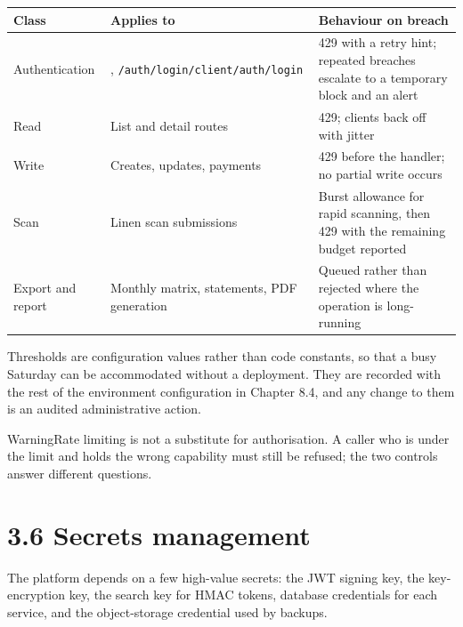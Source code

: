 \documentclass[11pt,a4paper,oneside]{book}
\begin{document}
\begin{center}\small
\begin{tabularx}{\linewidth}{|X|X|X|}
\hline
\rowcolor{lightgrey}
\textbf{Class} & \textbf{Applies to} & \textbf{Behaviour on breach} \\ \hline
Authentication & , \texttt{/auth/login}\texttt{/client/auth/login} & 429 with a retry hint; repeated breaches escalate to a temporary block and an alert \\ \hline
Read & List and detail routes & 429; clients back off with jitter \\ \hline
Write & Creates, updates, payments & 429 before the handler; no partial write occurs \\ \hline
Scan & Linen scan submissions & Burst allowance for rapid scanning, then 429 with the remaining budget reported \\ \hline
Export and report & Monthly matrix, statements, PDF generation & Queued rather than rejected where the operation is long-running \\ \hline
\end{tabularx}
\end{center}
Thresholds are configuration values rather than code constants, so that a busy Saturday can be accommodated without a deployment. They are recorded with the rest of the environment configuration in Chapter 8.4, and any change to them is an audited administrative action.

\begin{notebox}WarningRate limiting is not a substitute for authorisation. A caller who is under the limit and holds the wrong capability must still be refused; the two controls answer different questions.\end{notebox}
\section{3.6 Secrets management}
The platform depends on a few high-value secrets: the JWT signing key, the key-encryption key, the search key for HMAC tokens, database credentials for each service, and the object-storage credential used by backups.
\end{document}
